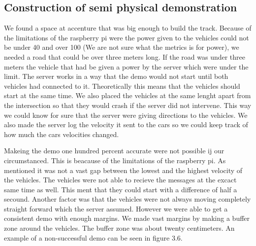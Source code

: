 \subsection{Construction of semi physical demonstration}

We found a space at accenture that was big enough to build the track. Because of the limitations of the raspberry pi were the power given to the vehicles could not be under 40 and over 100 (We are not sure what the metrics is for power), we needed a road that could be over three meters long. If the road was under three meters the vehicle that had be given a power by the server which were under the limit. The server works in a way that the demo would not start until both vehicles had connected to it. Theoretically this means that the vehicles should start at the same time. We also placed the vehicles at the same lenght apart from the intersection so that they would crash if the server did not intervene. This way we could know for sure that the server were giving directions to the vehicles. We also made the server log the velocity it sent to the cars so we could keep track of how much the cars velocities changed.

Makeing the demo one hundred percent accurate were not possible ij our circumstanced. This is beacause of the limitations of the raspberry pi. As mentioned it was not a vast gap between the lowest and the highest velocity of the vehicles. The vehicles were not able to recieve the messages at the excact same time as well. This ment that they could start with a difference of half a secound. Another factor was that the vehicles were not always moving completely straight forward which the server assumed. However we were able to get a consistent demo with enough margins. We made vast margins by making a buffer zone around the vehicles. The buffer zone was about twenty centimeters. An example of a non-successful demo can be seen in figure 3.6.

